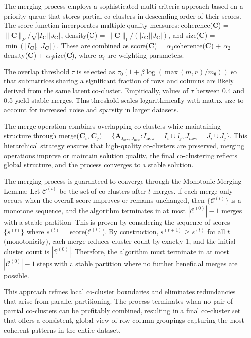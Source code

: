 \documentclass[journal]{IEEEtran}
\begin{document}
The merging process employs a sophisticated multi-criteria approach based on a priority queue that stores partial co-clusters in descending order of their scores. The score function incorporates multiple quality measures: coherence($\mathbf{C}$) = $\|\mathbf{C}\|_F/\sqrt{|I_{\mathbf{C}}||J_{\mathbf{C}}|}$, density($\mathbf{C}$) = $\|\mathbf{C}\|_1/(|I_{\mathbf{C}}||J_{\mathbf{C}}|)$, and size($\mathbf{C}$) = $\min(|I_{\mathbf{C}}|, |J_{\mathbf{C}}|)$. These are combined as score($\mathbf{C}$) = $\alpha_1$coherence($\mathbf{C}$) + $\alpha_2$density($\mathbf{C}$) + $\alpha_3$size($\mathbf{C}$), where $\alpha_i$ are weighting parameters.

The overlap threshold $\tau$ is selected as $\tau_0(1 + \beta\log(\max(m,n)/m_0))$ so that submatrices sharing a significant fraction of rows and columns are likely derived from the same latent co-cluster. Empirically, values of $\tau$ between 0.4 and 0.5 yield stable merges. This threshold scales logarithmically with matrix size to account for increased noise and sparsity in larger datasets.

The merge operation combines overlapping co-clusters while maintaining structure through merge($\mathbf{C}_i$, $\mathbf{C}_j$) = $\{\mathbf{A}_{I_{\text{new}}, J_{\text{new}}} : I_{\text{new}} = I_i \cup I_j, J_{\text{new}} = J_i \cup J_j\}$. This hierarchical strategy ensures that high-quality co-clusters are preserved, merging operations improve or maintain solution quality, the final co-clustering reflects global structure, and the process converges to a stable solution.

The merging process is guaranteed to converge through the Monotonic Merging Lemma: Let $\mathcal{C}^{(t)}$ be the set of co-clusters after $t$ merges. If each merge only occurs when the overall score improves or remains unchanged, then $\{\mathcal{C}^{(t)}\}$ is a monotone sequence, and the algorithm terminates in at most $|\mathcal{C}^{(0)}|-1$ merges with a stable partition. This is proven by considering the sequence of scores $\{s^{(t)}\}$ where $s^{(t)}$ = score($\mathcal{C}^{(t)}$). By construction, $s^{(t+1)} \geq s^{(t)}$ for all $t$ (monotonicity), each merge reduces cluster count by exactly 1, and the initial cluster count is $|\mathcal{C}^{(0)}|$. Therefore, the algorithm must terminate in at most $|\mathcal{C}^{(0)}|-1$ steps with a stable partition where no further beneficial merges are possible.

This approach refines local co-cluster boundaries and eliminates redundancies that arise from parallel partitioning. The process terminates when no pair of partial co-clusters can be profitably combined, resulting in a final co-cluster set that offers a consistent, global view of row-column groupings capturing the most coherent patterns in the entire dataset.
\end{document}
